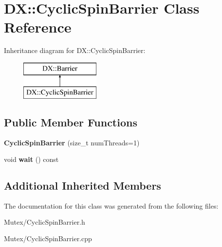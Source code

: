 \hypertarget{class_d_x_1_1_cyclic_spin_barrier}{\section{D\-X\-:\-:Cyclic\-Spin\-Barrier Class Reference}
\label{class_d_x_1_1_cyclic_spin_barrier}
}
Inheritance diagram for D\-X\-:\-:Cyclic\-Spin\-Barrier\-:\begin{figure}[H]
\begin{center}
\leavevmode
\includegraphics[height=2.000000cm]{class_d_x_1_1_cyclic_spin_barrier}
\end{center}
\end{figure}
\subsection*{Public Member Functions}
\begin{DoxyCompactItemize}
\item 
\hypertarget{class_d_x_1_1_cyclic_spin_barrier_a5450fa600f1c497b4c08d69a0df49929}{{\bfseries Cyclic\-Spin\-Barrier} (size\-\_\-t num\-Threads=1)}\label{class_d_x_1_1_cyclic_spin_barrier_a5450fa600f1c497b4c08d69a0df49929}

\item 
\hypertarget{class_d_x_1_1_cyclic_spin_barrier_abdb6dfc6f2146dce6bcf39718a6f92e5}{void {\bfseries wait} () const }\label{class_d_x_1_1_cyclic_spin_barrier_abdb6dfc6f2146dce6bcf39718a6f92e5}

\end{DoxyCompactItemize}
\subsection*{Additional Inherited Members}


The documentation for this class was generated from the following files\-:\begin{DoxyCompactItemize}
\item 
Mutex/Cyclic\-Spin\-Barrier.\-h\item 
Mutex/Cyclic\-Spin\-Barrier.\-cpp\end{DoxyCompactItemize}
